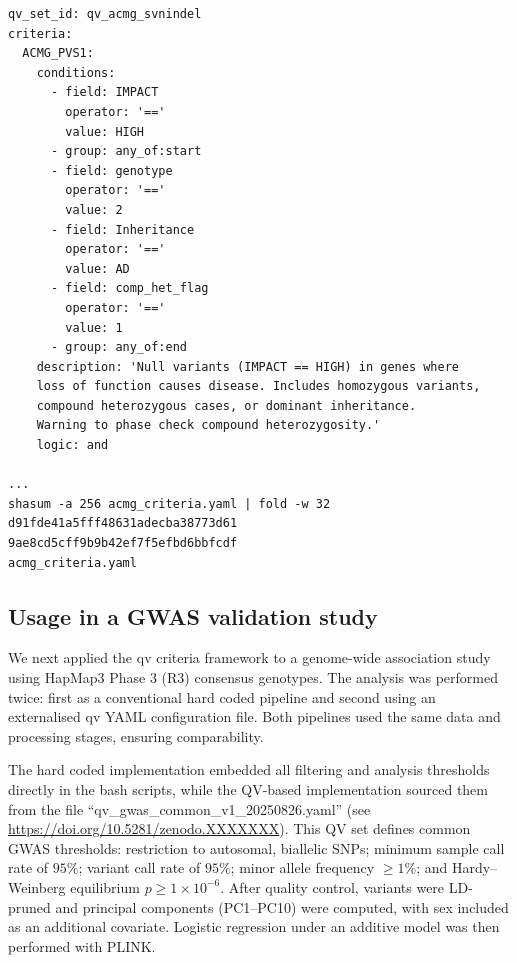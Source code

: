 \begin{tcolorbox}[
    colback=white!0,
    colframe=black,
    boxrule=1pt,
    arc=1mm,
    outer arc=1mm,
    title=\textbf{\refstepcounter{myboxcounter}\label{box:acmg_criteria_yaml}Box \themyboxcounter: qv\_files/acmg\_criteria.yaml}
]
\begin{verbatim}
qv_set_id: qv_acmg_svnindel
criteria:
  ACMG_PVS1:
    conditions:
      - field: IMPACT
        operator: '=='
        value: HIGH
      - group: any_of:start
      - field: genotype
        operator: '=='
        value: 2
      - field: Inheritance
        operator: '=='
        value: AD
      - field: comp_het_flag
        operator: '=='
        value: 1
      - group: any_of:end
    description: 'Null variants (IMPACT == HIGH) in genes where 
    loss of function causes disease. Includes homozygous variants, 
    compound heterozygous cases, or dominant inheritance.
    Warning to phase check compound heterozygosity.'
    logic: and

...
shasum -a 256 acmg_criteria.yaml | fold -w 32
d91fde41a5fff48631adecba38773d61
9ae8cd5cff9b9b42ef7f5efbd6bbfcdf
acmg_criteria.yaml
\end{verbatim}
\end{tcolorbox}


\subsection{Usage in a GWAS validation study}

We next applied the \ac{qv} criteria framework to a genome-wide association study using HapMap3 Phase 3 (R3) consensus genotypes. The analysis was performed twice: first as a conventional hard coded pipeline and second using an externalised \ac{qv} YAML configuration file. Both pipelines used the same data and processing stages, ensuring comparability.  

The hard coded implementation embedded all filtering and analysis thresholds directly in the bash scripts, while the QV-based implementation sourced them from the file ``qv\_gwas\_common\_v1\_20250826.yaml'' (see \url{https://doi.org/10.5281/zenodo.XXXXXXX}). This QV set defines common GWAS thresholds: restriction to autosomal, biallelic SNPs; minimum sample call rate of $95\%$; variant call rate of $95\%$; minor allele frequency $\geq 1\%$; and Hardy–Weinberg equilibrium $p \geq 1\times10^{-6}$. After quality control, variants were LD-pruned and principal components (PC1–PC10) were computed, with sex included as an additional covariate. Logistic regression under an additive model was then performed with PLINK.  

